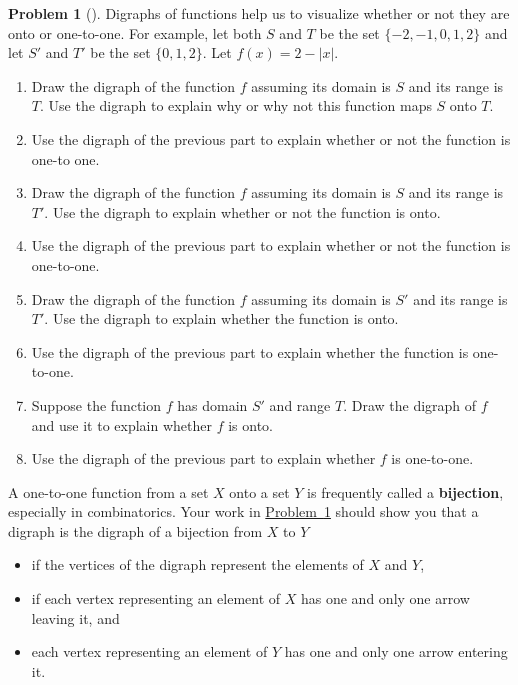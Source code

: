 \documentclass[10pt,]{book}
\newcommand{\terminology}[1]{\textbf{#1}}
\theoremstyle{plain}
\theoremstyle{definition}
\newtheorem{activity}[project]{Problem}
\theoremstyle{definition}
\numberwithin{equation}{chapter}
\begin{document}
\begin{activity}[]\marginsymbol[-1em]{} \label{functiondigraphs-prob}
Digraphs of functions help us to visualize whether or not they are onto or one-to-one. For example, let both \(S\) and \(T\) be the set \(\{-2, -1, 0 ,1, 2\}\) and let \(S'\) and \(T'\) be the set \(\{0,1,2\}\).  Let \(f(x) = 2-|x|\).%
\begin{enumerate}[font=\bfseries,label=(\alph*),ref=\alph*]
\item\label{task-246} \marginsymbol[-2.5em]{} Draw the digraph of the function \(f\) assuming its domain is \(S\) and its range is \(T\).  Use the digraph to explain why or why not this function maps \(S\) onto \(T\).%
\item\label{task-247} \marginsymbol[-2.5em]{} Use the digraph of the previous part to explain whether or not the function is one-to one.%
\item\label{task-248} \marginsymbol[-2.5em]{} Draw the digraph of the function \(f\) assuming its domain is \(S\) and its range is \(T'\). Use the digraph to explain whether or not the function is onto.%
\item\label{task-249} \marginsymbol[-2.5em]{} Use the digraph of the previous part to explain whether or not the function is one-to-one.%
\item\label{task-250} \marginsymbol[-2.5em]{} Draw the digraph of the function \(f\) assuming its domain is \(S'\) and its range is \(T'\). Use the digraph to explain whether the function is onto.%
\item\label{task-251} \marginsymbol[-2.5em]{} Use the digraph of the previous part to explain whether the function is one-to-one.%
\item\label{task-252} \marginsymbol[-2.5em]{} Suppose the function \(f\) has domain \(S'\) and range \(T\).  Draw the digraph of \(f\) and use it to explain whether \(f\) is onto.%
\item\label{task-253} \marginsymbol[-2.5em]{} Use the digraph of the previous part to explain whether \(f\) is one-to-one.%
\end{enumerate}
\end{activity}
A one-to-one function from a set \(X\) onto a set \(Y\) is frequently called a \terminology{bijection}, especially in combinatorics.  Your work in \hyperref[functiondigraphs-prob]{Problem~\ref{functiondigraphs-prob}} should show you that a digraph is the digraph of a bijection from \(X\) to \(Y\) \leavevmode%
\begin{itemize}[label=\textbullet]
\item{}if the vertices of the digraph represent the elements of \(X\) and \(Y\),%
\item{}if each vertex representing an element of \(X\) has one and only one arrow leaving it, and%
\item{}each vertex representing an element of \(Y\) has one and only one arrow entering it.%
\end{itemize}
\end{document}
